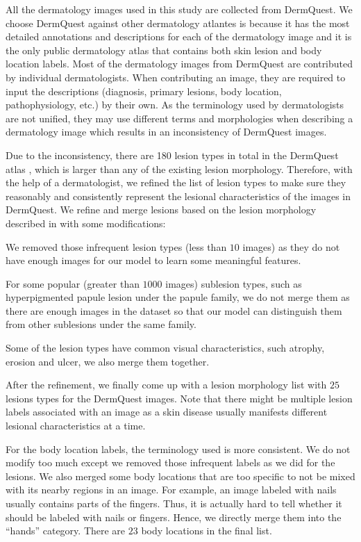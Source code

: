 \documentclass[letterpaper]{article}
\begin{document}
All the dermatology images used in this study are collected from DermQuest. We choose
DermQuest against other dermatology atlantes is because it has the most detailed
annotations and descriptions for each of the dermatology image and it is the only
public dermatology atlas that contains both skin lesion and body location labels.
Most of the dermatology images from DermQuest are contributed by individual dermatologists.
When contributing an image, they are required to input the descriptions
(diagnosis, primary lesions, body location, pathophysiology, etc.) by their own.
As the terminology used by dermatologists are not unified, they may use different
terms and morphologies when describing a dermatology image which results in an
inconsistency of DermQuest images.

Due to the inconsistency, there are  180 lesion types in total in the DermQuest atlas
, which is larger than any of the existing lesion morphology. Therefore, with the
help of a dermatologist, we refined the list of lesion types to make sure they
reasonably and consistently represent the lesional characteristics of the images
in DermQuest. We refine and merge lesions based on the lesion morphology described in \cite{cox2004diagnosis}
with some modifications:
\begin{inparaenum}[1)]
  \item We removed those infrequent lesion types (less than $10$ images) as they do not
  have enough images for our model to learn some meaningful features.
  \item For some popular (greater than $1000$ images) sublesion types, such as hyperpigmented
  papule lesion under the papule family, we do not merge them as there are enough images in the
  dataset so that our model can distinguish them from other sublesions under the
  same family.
  \item Some of the lesion types have common visual characteristics, such atrophy, erosion and
  ulcer, we also merge them together.
\end{inparaenum}
After the refinement, we finally come up with a lesion morphology list with $25$
lesions types for the DermQuest images. Note that there might be multiple
lesion labels associated with an image as a skin disease usually manifests
different lesional characteristics at a time.

For the body location labels, the terminology used is more consistent. We do not
modify too much except we removed those infrequent labels as we did for the lesions. We also
merged some body locations that are too specific to not be mixed with its nearby
regions in an image. For example, an image labeled with nails usually contains
parts of the fingers. Thus, it is actually hard to tell whether it should be labeled
with nails or fingers. Hence, we directly merge them into the ``hands'' category.
There are $23$ body locations in the final list.
\end{document}
